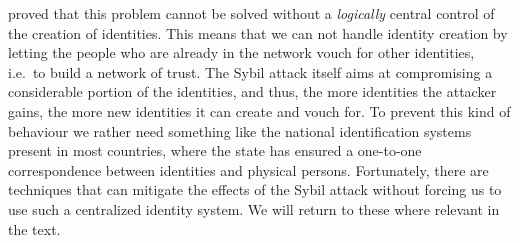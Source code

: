  proved that this problem cannot be solved without 
a \emph{logically} central control of the creation of identities.
This means that we can not handle identity creation by letting the people who 
are already in the network vouch for other identities, i.e.\ to build a network 
of trust.
The Sybil attack itself aims at compromising a considerable portion of the 
identities, and thus, the more identities the attacker gains, the more new 
identities it can create and vouch for.
To prevent this kind of behaviour we rather need something like the national 
identification systems present in most countries, where the state has ensured 
a one-to-one correspondence between identities and physical persons.
Fortunately, there are techniques that can mitigate the effects of the Sybil 
attack without forcing us to use such a centralized identity system.
We will return to these where relevant in the text.
